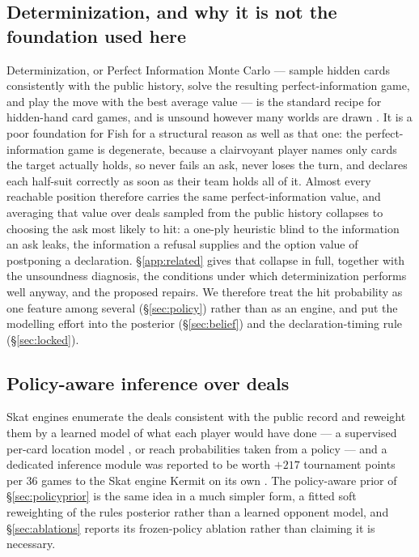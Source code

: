 \subsection{Determinization, and why it is not the foundation used here}

Determinization, or Perfect Information Monte Carlo --- sample hidden cards
consistently with the public history, solve the resulting perfect-information
game, and play the move with the best average value \cite{ginsberg-gib} --- is
the standard recipe for hidden-hand card games, and is unsound however many
worlds are drawn \cite{frank-basin-ai}. It is a poor foundation for Fish for a
structural reason as well as that one: the perfect-information game is
degenerate, because a clairvoyant player names only cards the target actually
holds, so never fails an ask, never loses the turn, and declares each half-suit
correctly as soon as their team holds all of it. Almost every reachable position
therefore carries the same perfect-information value, and averaging that value
over deals sampled from the public history collapses to choosing the ask most
likely to hit: a one-ply heuristic blind to the information an ask leaks, the
information a refusal supplies and the option value of postponing a declaration.
\S\ref{app:related} gives that collapse in full, together with the unsoundness
diagnosis, the conditions under which determinization performs well anyway, and
the proposed repairs. We therefore treat the hit probability as one feature among
several (\S\ref{sec:policy}) rather than as an engine, and put the modelling
effort into the posterior (\S\ref{sec:belief}) and the declaration-timing rule
(\S\ref{sec:locked}).

\subsection{Policy-aware inference over deals}

Skat engines enumerate the deals consistent with the public record and
reweight them by a learned model of what each player would have done --- a
supervised per-card location model \cite{solinas-supervised}, or reach
probabilities taken from a policy \cite{rebstock-inference} --- and a
dedicated inference module was reported to be worth $+217$ tournament points
per 36 games to the Skat engine Kermit on its own \cite{buro-kermit}. The
policy-aware prior of \S\ref{sec:policyprior} is the same idea in a much
simpler form, a fitted soft reweighting of the rules posterior rather than a
learned opponent model, and \S\ref{sec:ablations} reports its frozen-policy
ablation rather than claiming it is necessary.

